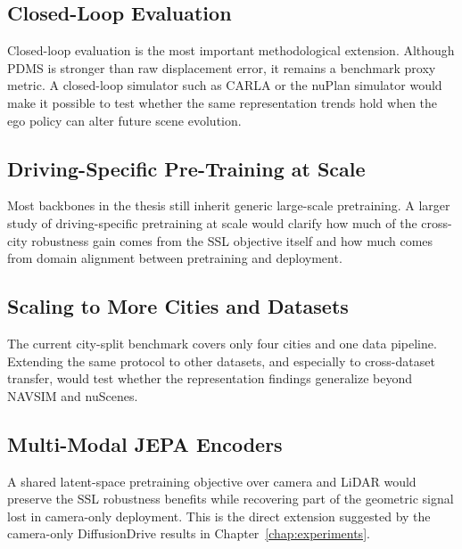 \subsection{Closed-Loop Evaluation}
Closed-loop evaluation is the most important methodological extension. Although PDMS is stronger than raw displacement error, it remains a benchmark proxy metric. A closed-loop simulator such as CARLA or the nuPlan simulator would make it possible to test whether the same representation trends hold when the ego policy can alter future scene evolution.

\subsection{Driving-Specific Pre-Training at Scale}
Most backbones in the thesis still inherit generic large-scale pretraining. A larger study of driving-specific pretraining at scale would clarify how much of the cross-city robustness gain comes from the SSL objective itself and how much comes from domain alignment between pretraining and deployment.

\subsection{Scaling to More Cities and Datasets}
The current city-split benchmark covers only four cities and one data pipeline. Extending the same protocol to other datasets, and especially to cross-dataset transfer, would test whether the representation findings generalize beyond NAVSIM and nuScenes.

\subsection{Multi-Modal JEPA Encoders}
A shared latent-space pretraining objective over camera and LiDAR would preserve the SSL robustness benefits while recovering part of the geometric signal lost in camera-only deployment. This is the direct extension suggested by the camera-only DiffusionDrive results in Chapter~\ref{chap:experiments}.
